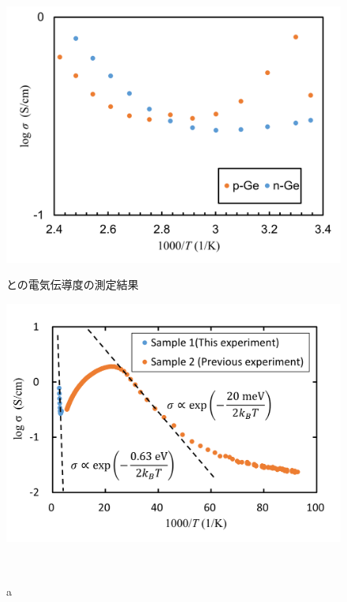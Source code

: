 \documentclass[11pt,dvipdfmx,a4paper]{jsarticle}
\numberwithin{equation}{section}
\begin{document}
\begin{figure}[h]
	\begin{minipage}{0.49\columnwidth}
		\centering
		\includegraphics[width=\columnwidth]{graph/graph09.png}
		\caption{との電気伝導度の測定結果}
		\label{graph:09}
	\end{minipage}
	\hfil
	\begin{minipage}{0.49\columnwidth}
		\centering
		\includegraphics[width=\columnwidth]{graph/graph06.png}
		\caption{a}
		\label{graph:06}
	\end{minipage}\\


\end{figure}
\end{document}

